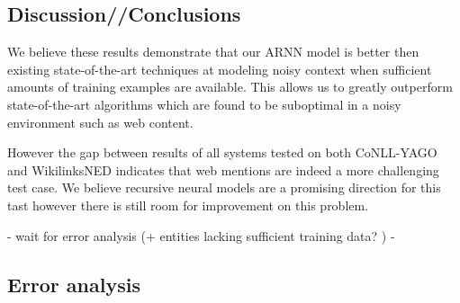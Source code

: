 \documentclass[11pt]{article}
\begin{document}
\subsection{Discussion//Conclusions}
We believe these results demonstrate that our ARNN model is better then existing state-of-the-art techniques at modeling noisy context when sufficient amounts of training examples are available. This allows us to greatly outperform state-of-the-art algorithms which are found to be suboptimal in a noisy environment such as web content. 

However the gap between results of all systems tested on both CoNLL-YAGO and WikilinksNED indicates that web mentions are indeed a more challenging test case. We believe recursive neural models are a promising direction for this tast however there is still room for improvement on this problem. 

- wait for error analysis (+ entities lacking sufficient training data? ) -

\subsection{Error analysis}


\end{document}

